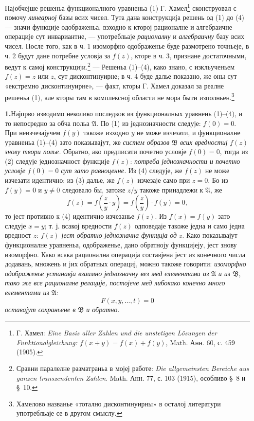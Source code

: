 \documentclass[11pt]{article}
\providecommand{\Afield}{\mathfrak A}
\providecommand{\Bfield}{\mathfrak B}
\begin{document}
Најобчејше решеньа функционалного уравненьа (1) Г. Хамел\footnote{Г. Хамел: \emph{Eine Basis aller Zahlen und die unstetigen Lösungen der Funktionalgleichung: \(f(x+y)=f(x)+f(y)\)}, Math. Анн. 60, с. 459 (1905).} сконструовал с помочу {\itshape линеарној} базы всих чисел. Тута дана конструкција решень од (1) до (4) --- значи функције одображеньа, взходно к кторој рационалне и алгебраичне операције сут инвариантне, --- употребльаје {\itshape рационалну} и {\itshape алгебраичну} базу всих чисел. После того, как в ч. 1 изоморфно одображенье буде размотрено точньеје, в ч. 2 будут дане потребне условја за \(f(z)\), кторе в ч. 3, признане достаточными, ведут к самој конструкцији.\footnote{Сравни паралелне разматраньа в мојеј работе: \emph{Die allgemeinsten Bereiche aus ganzen transzendenten Zahlen}. Math. Анн. 77, с. 103 (1915), особливо \S\ 8 и \S\ 10.} --- Решеньа (1)--(4), како знано, с изкльученьем \(f(z)=z\) или \(\overline z\), сут дисконтинуирне; в ч. 4 буде далье показано, же оны сут «екстремно дисконтинуирне», --- факт, кторы Г. Хамел доказал за реалне решеньа (1), але кторы там в комплексној области не мора быти изполньен.\footnote{Хамелово названье «тотално дисконтинуирны» в осталој литератури употребльаје се в другом смыслу.}

\medskip
\noindent\textbf{1.}\quad Најпрво изводимо неколико последков из функционалных уравнень (1)--(4), и то непосредно за обча польа \(\Afield\). По (1) из једнозначности следује: \(f(0)=0\). При неизчезајучем \(f(y)\) такоже изходно \(y\) не може изчезати, и функционалне уравненьа (1)--(4) зато показывајут, же {\itshape систем образов} \(\Bfield\) {\itshape всих вредностиј} \(f(z)\) {\itshape знову твори полье.} Обратно, ако предписати почетно условје \(f(0)=0\), тогда из (2) следује једнозначност функције \(f(z)\): {\itshape потреба једнозначности и почетно условје} \(f(0)=0\) {\itshape сут зато равноценне.} Из (4) следује, же \(f(z)\) не може изчезати идентично; из (3) далье, же \(f(z)\) изчезаје само при \(z=0\). Бо из \(f(y)=0\) и \(y\ne0\) следовало бы, затоже \(z/y\) такоже принадлежи к \(\Afield\), же
\[
f(z)=f\!\left(\frac{z}{y}\cdot y\right)=f\!\left(\frac{z}{y}\right)\cdot f(y)=0,
\]
то јест противно к (4) идентично изчезанье \(f(z)\). Из \(f(x)=f(y)\) зато следује \(x=y\); т. ј. всакој вредности \(f(z)\) одповедаје такоже једна и само једна вредност \(z\): {\itshape \(f(z)\) јест обратно-једнозначна функција од} \(z\). Како показывајут функционалне уравненьа, одображенье, дано обратноју функцијеју, јест знову изоморфно. Како всака рационална операција составјена јест из конечного числа додавань, множень и јих обратных операциј, можно такоже говорити: {\itshape изоморфно одображенье устанавја взаимно једнозначну вез мед елементами из} \(\Afield\) {\itshape и из} \(\Bfield\), {\itshape тако же все рационалне релације, постојече мед либокако конечно много елементами из} \(\Afield\):
\[
F(x,y,\ldots,t)=0
\]
{\itshape оставајут сохраньене в} \(\Bfield\) {\itshape и обратно.}
\end{document}
